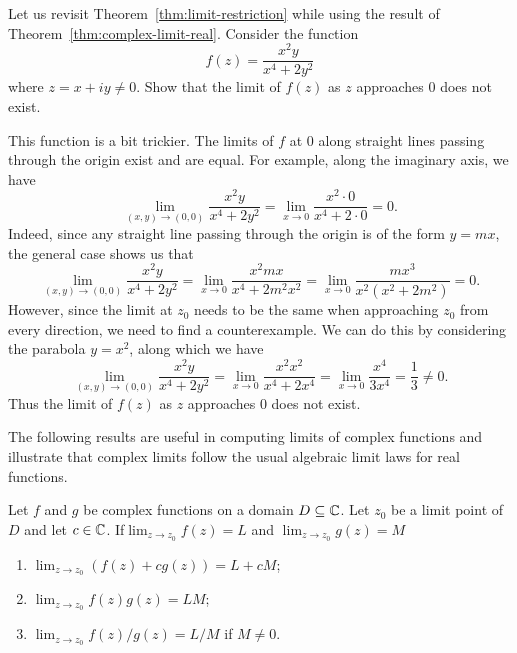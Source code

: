 \begin{example}
    Let us revisit Theorem~\ref{thm:limit-restriction} while using the result of Theorem~\ref{thm:complex-limit-real}. Consider the function
    \[
        f(z) = \frac{x^2 y}{x^4 + 2y^2}
    \]
    where \(z = x + iy \neq 0\). Show that the limit of \(f(z)\) as \(z\) approaches \(0\) does not exist.

    \begin{solution}
        This function is a bit trickier. The limits of \(f\) at \(0\) along straight lines passing through the origin exist and are equal. For example, along the imaginary axis, we have
        \begin{equation*}
            \lim_{(x, y) \to (0, 0)} \frac{x^2 y}{x^4 + 2y^2} = \lim_{x \to 0} \frac{x^2 \cdot 0}{x^4 + 2\cdot 0} = 0.
        \end{equation*}
        Indeed, since any straight line passing through the origin is of the form \(y = mx\), the general case shows us that
        \begin{equation*}
            \lim_{(x, y) \to (0, 0)} \frac{x^2 y}{x^4 + 2y^2} = \lim_{x \to 0} \frac{x^2 mx}{x^4 + 2m^2 x^2} = \lim_{x \to 0} \frac{mx^3}{x^2(x^2 + 2m^2)} = 0.
        \end{equation*}
        However, since the limit at \(z_0\) needs to be the same when approaching \(z_0\) from every direction, we need to find a counterexample. We can do this by considering the parabola \(y = x^2\), along which we have
        \begin{equation*}
            \lim_{(x, y) \to (0, 0)} \frac{x^2 y}{x^4 + 2y^2} = \lim_{x \to 0} \frac{x^2 x^2}{x^4 +2x^4} = \lim_{x \to 0} \frac{x^4}{3x^4} = \frac{1}{3} \neq 0.
        \end{equation*}
        Thus the limit of \(f(z)\) as \(z\) approaches \(0\) does not exist.
    \end{solution}
\end{example}

The following results are useful in computing limits of complex functions and illustrate that complex limits follow the usual algebraic limit laws for real functions.

\begin{theorem}%
    Let \(f\) and \(g\) be complex functions on a domain \(D \subseteq \mathbb{C}\). Let \(z_0\) be a limit point of \(D\) and let \(c \in \mathbb{C}\). If\(\lim_{z \to z_0} f(z) = L\) and \(\lim_{z \to z_0} g(z) = M\)
    \begin{enumerate}[label=(\alph*)]
        \item \(\lim_{z \to z_0} (f(z) + c g(z)) = L + cM\);
        \item \(\lim_{z \to z_0} f(z)g(z) = LM\);
        \item \(\lim_{z \to z_0} f(z)/g(z) = L/M\) if \(M \neq 0\).
    \end{enumerate}
\end{theorem}

